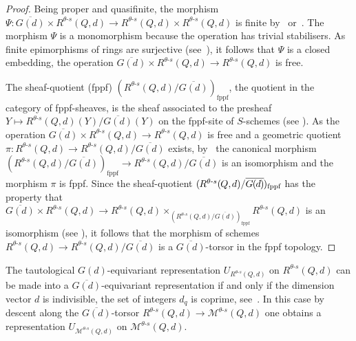 \documentclass[ALCO,ThmDefs,Unicode,epreuves]{cedram}
\newcommand*{\mk}{\mkern -1mu}
\begin{document}
\begin{proof}
Being proper and quasifinite, the morphism $\Psi\colon\overline{G(d)}\times 
R^{\theta\text{-}s}(Q,d)\to R^{\theta\text{-}s}(Q,d)\times R^{\theta\text{-}s}(Q,d)$ 
is finite by~\cite[III (1), (4.4.2)]{EGA} or~\cite[IV (3), (8.11.1)]{EGA}.
The morphism $\Psi$ is a monomorphism because the operation has trivial stabilisers.
As finite epimorphisms of rings are surjective (see~\cite[Ch.~IV, Prop.~1.7]{La69}), 
it follows that $\Psi$ is a closed embedding, \ie the operation
$\overline{G(d)}\times R^{\theta\text{-}s}(Q,d)\to R^{\theta\text{-}s}(Q,d)$ is free.

The sheaf-quotient (fppf) $(R^{\theta\text{-}s}(Q,d)/\overline{G(d)})_{\text{fppf}}$,
\ie the quotient in the category of fppf-sheaves, is the sheaf associated 
to the presheaf $Y\mapsto R^{\theta\text{-}s}(Q,d)(Y)/\overline{G(d)}(Y)$ 
on the fppf-site of $S$-schemes (see \eg \cite[3.4.1]{Br14}). As the operation 
$\overline{G(d)}\times R^{\theta\text{-}s}(Q,d)\to R^{\theta\text{-}s}(Q,d)$ 
is free and a geometric quotient
$\pi\colon R^{\theta\text{-}s}(Q,d)\to R^{\theta\text{-}s}(Q,d)/\overline{G(d)}$ 
exists, by~\cite[Thm.~6]{An73} the canonical morphism
$(R^{\theta\text{-}s}(Q,d)/\overline{G(d)})_{\text{fppf}}\to 
R^{\theta\text{-}s}(Q,d)/\overline{G(d)}$ 
is an isomorphism and the morphism $\pi$ is fppf. 
Since the sheaf-quotient 
$(\mk R^{\theta\text{-}s}(\mk Q,\mk d)/\overline{G\mk (\mk d\mk )}\mk )_{\text{fppf}}$
has the property that $\overline{G(d)}\times R^{\theta\text{-}s}(Q,d)\to
R^{\theta\text{-}s}(Q,d)\times_{(R^{\theta\text{-}s}(Q,d)/
\overline{G(d)})_{\text{fppf}}}R^{\theta\text{-}s}(Q,d)$
is an isomorphism (see \eg \cite[3.4.5]{Br14}), it follows that the morphism 
of schemes $R^{\theta\text{-}s}(Q,d)\to R^{\theta\text{-}s}(Q,d)/\overline{G(d)}$ 
is a $\overline{G(d)}$-torsor in the fppf topology.
\end{proof}

The tautological $G(d)$-equivariant representation $U_{R^{\theta\text{-}s}(Q,d)}$
on $R^{\theta\text{-}s}(Q,d)$ can be made into a $\overline{G(d)}$-equivariant 
representation if and only if the dimension vector $d$ is indivisible, 
\ie the set of integers $d_q$ is coprime, see~\cite[Proof of Prop.~5.3]{Ki94}.
In this case by descent along the $\overline{G(d)}$-torsor
$R^{\theta\text{-}s}(Q,d)\to\mathcal M^{\theta\text{-}s}(Q,d)$ one obtains
a representation $U_{\mathcal M^{\theta\text{-}s}(Q,d)}$ 
on $\mathcal M^{\theta\text{-}s}(Q,d)$.
\end{document}
